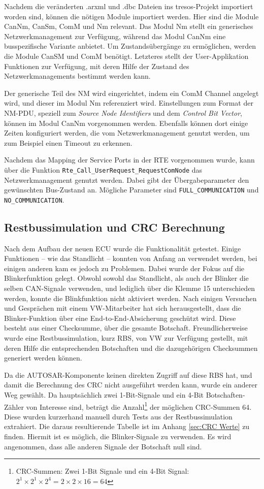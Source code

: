 \documentclass[
  a4paper,					    %
  twoside,
  DIV=calc,     				%
  bibliography=totoc,
  cleardoublepage=empty,
  ngerman,     					%
  final       					%
]{scrbook}
\begin{document}
Nachdem die veränderten .arxml und .dbc Dateien ins tresos-Projekt importiert worden sind, können die nötigen Module importiert werden. Hier sind die Module CanNm, CanSm, ComM und Nm relevant. Das Modul Nm stellt ein generisches Netzwerkmanagement zur Verfügung, während das Modul CanNm eine busspezifische Variante anbietet. Um Zustandsübergänge zu ermöglichen, werden die Module CanSM und ComM benötigt. Letzteres stellt der User-Applikation Funktionen zur Verfügung, mit deren Hilfe der Zustand des Netzwerkmanagements bestimmt werden kann.

Der generische Teil des NM wird eingerichtet, indem ein ComM Channel angelegt wird, und dieser im Modul Nm referenziert wird. Einstellungen zum Format der NM-PDU, speziell zum \emph{Source Node Identifiers} und dem \emph{Control Bit Vector}, können im Modul CanNm vorgenommen werden. Ebenfalls können dort einige Zeiten konfiguriert werden, die vom Netzwerkmanagement genutzt werden, um zum Beispiel einen Timeout zu erkennen.

Nachdem das Mapping der Service Ports in der RTE vorgenommen wurde, kann über die Funktion \texttt{Rte\_Call\_UserRequest\_RequestComNode} das Netzwerkmanagement genutzt werden. Dabei gibt der Übergabeparameter den gewünschten Bus-Zustand an. Mögliche Parameter sind \texttt{FULL\_COMMUNICATION} und \texttt{NO\_COMMUNICATION}.




\subsection{Restbussimulation und CRC Berechnung}
\label{sec:RBS}
Nach dem Aufbau der neuen ECU wurde die Funktionalität getestet. Einige Funktionen -- wie das Standlicht -- konnten von Anfang an verwendet werden, bei einigen anderen kam es jedoch zu Problemen. Dabei wurde der Fokus auf die Blinkerfunktion gelegt. Obwohl sowohl das Standlicht, als auch der Blinker die selben CAN-Signale verwenden, und lediglich über die Klemme 15 unterschieden werden, konnte die Blinkfunktion nicht aktiviert werden. Nach einigen Versuchen und Gesprächen mit einem VW-Mitarbeiter hat sich herausgestellt, dass die Blinker-Funktion über eine End-to-End-Absicherung geschützt wird. Diese besteht aus einer Checksumme, über die gesamte Botschaft. Freundlicherweise wurde eine Restbussimulation, kurz RBS, von VW zur Verfügung gestellt, mit deren Hilfe die entsprechenden Botschaften und die dazugehörigen Checksummen generiert werden können. 

Da die AUTOSAR-Komponente keinen direkten Zugriff auf diese RBS hat, und damit die Berechnung des CRC nicht ausgeführt werden kann, wurde ein anderer Weg gewählt. Da hauptsächlich zwei 1-Bit-Signale und ein 4-Bit Botschaften-Zähler von Interesse sind, beträgt die Anzahl\footnote{CRC-Summen: Zwei 1-Bit Signale und ein 4-Bit Signal: $ 2^1 \times 2^1 \times 2^4 = 2 \times 2 \times 16 = 64 $} der möglichen CRC-Summen 64. Diese wurden kurzerhand manuell durch Tests aus der Restbussimulation extrahiert. Die daraus resultierende Tabelle ist im Anhang \ref{sec:CRC Werte} zu finden. Hiermit ist es möglich, die Blinker-Signale zu verwenden. Es wird angenommen, dass alle anderen Signale der Botschaft null sind.
\end{document}
